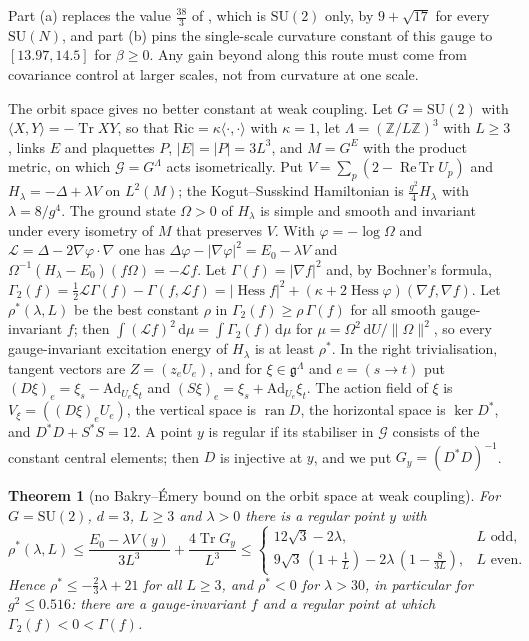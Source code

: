 \documentclass[11pt,a4paper]{amsart}
\newtheorem{theorem}{Theorem}[section]
\theoremstyle{definition}
\theoremstyle{remark}
\numberwithin{equation}{section}
\DeclareMathOperator{\Tr}{Tr}        %
\DeclareMathOperator{\ReTr}{Re\,Tr}  %
\DeclareMathOperator{\Hess}{Hess}    %
\newcommand{\Z}{\mathbb{Z}}          %
\newcommand{\ip}[2]{\langle #1,#2\rangle}  %
\newcommand{\norm}[1]{\lVert #1\rVert}     %
\newcommand{\abs}[1]{\lvert #1\rvert}      %
\newcommand{\dd}{\,\mathrm{d}}             %
\newcommand{\SU}{\mathrm{SU}}              %
\begin{document}
Part (a) replaces the value $\frac{38}3$ of \cite[Theorem~A5]{bhattacharjee2026first}, which is $\SU(2)$ only, by $9+\sqrt{17}$ for every $\SU(N)$, and part (b) pins the single-scale curvature constant of this gauge to $[13.97,14.5]$ for $\beta\ge0$. Any gain beyond \cite[Theorem~A]{bhattacharjee2026first} along this route must come from covariance control at larger scales, not from curvature at one scale.

The orbit space gives no better constant at weak coupling. Let $G=\SU(2)$ with $\ip XY=-\Tr XY$, so that $\mathrm{Ric}=\kappa\ip\cdot\cdot$ with $\kappa=1$, let $\Lambda=(\Z/L\Z)^3$ with $L\ge3$, links $E$ and plaquettes $P$, $\abs E=\abs P=3L^3$, and $M=G^E$ with the product metric, on which $\mathcal G=G^\Lambda$ acts isometrically. Put $V=\sum_p(2-\ReTr U_p)$ and $H_\lambda=-\Delta+\lambda V$ on $L^2(M)$; the Kogut--Susskind Hamiltonian is $\frac{g^2}4H_\lambda$ with $\lambda=8/g^4$. The ground state $\Omega>0$ of $H_\lambda$ is simple and smooth and invariant under every isometry of $M$ that preserves $V$. With $\varphi=-\log\Omega$ and $\mathcal L=\Delta-2\nabla\varphi\cdot\nabla$ one has $\Delta\varphi-\abs{\nabla\varphi}^2=E_0-\lambda V$ and $\Omega^{-1}(H_\lambda-E_0)(f\Omega)=-\mathcal Lf$. Let $\Gamma(f)=\abs{\nabla f}^2$ and, by Bochner's formula, $\Gamma_2(f)=\frac12\mathcal L\Gamma(f)-\Gamma(f,\mathcal Lf)=\abs{\Hess f}^2+(\kappa+2\Hess\varphi)(\nabla f,\nabla f)$. Let $\rho^*(\lambda,L)$ be the best constant $\rho$ in $\Gamma_2(f)\ge\rho\,\Gamma(f)$ for all smooth gauge-invariant $f$; then $\int(\mathcal Lf)^2\dd\mu=\int\Gamma_2(f)\dd\mu$ for $\mu=\Omega^2\dd U/\norm\Omega^2$, so every gauge-invariant excitation energy of $H_\lambda$ is at least $\rho^*$. In the right trivialisation, tangent vectors are $Z=(z_eU_e)$, and for $\xi\in\mathfrak g^\Lambda$ and $e=(s\to t)$ put $(D\xi)_e=\xi_s-\mathrm{Ad}_{U_e}\xi_t$ and $(S\xi)_e=\xi_s+\mathrm{Ad}_{U_e}\xi_t$. The action field of $\xi$ is $V_\xi=((D\xi)_eU_e)$, the vertical space is $\operatorname{ran}D$, the horizontal space is $\ker D^*$, and $D^*D+S^*S=12$. A point $y$ is regular if its stabiliser in $\mathcal G$ consists of the constant central elements; then $D$ is injective at $y$, and we put $G_y=(D^*D)^{-1}$.

\begin{theorem}[no Bakry--\'Emery bound on the orbit space at weak coupling]\label{thm:BE-orbit}
For $G=\SU(2)$, $d=3$, $L\ge3$ and $\lambda>0$ there is a regular point $y$ with
\[
\rho^*(\lambda,L)\le\frac{E_0-\lambda V(y)}{3L^3}+\frac{4\Tr G_y}{L^3}\le\begin{cases}12\sqrt3-2\lambda,&L\text{ odd},\\ 9\sqrt3\,(1+\frac1L)-2\lambda\,(1-\frac8{3L}),&L\text{ even}.\end{cases}
\]
Hence $\rho^*\le-\frac23\lambda+21$ for all $L\ge3$, and $\rho^*<0$ for $\lambda>30$, in particular for $g^2\le0.516$: there are a gauge-invariant $f$ and a regular point at which $\Gamma_2(f)<0<\Gamma(f)$.
\end{theorem}
\end{document}
